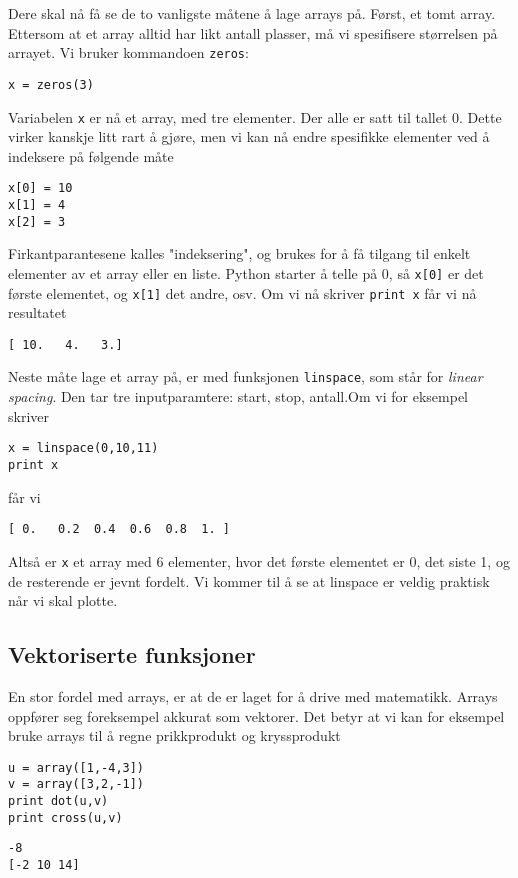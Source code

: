 \documentclass[a4paper, 11pt, notitlepage]{article}
\begin{document}
Dere skal nå få se de to vanligste måtene å lage arrays på. Først, et tomt array. Ettersom at et array alltid har likt antall plasser, må vi spesifisere størrelsen på arrayet. Vi bruker kommandoen \verb+zeros+:
\begin{lstlisting}
x = zeros(3)    
\end{lstlisting}
\vspace{-0.3cm}
Variabelen \verb+x+ er nå et array, med tre elementer. Der alle er satt til tallet 0. Dette virker kanskje litt rart å gjøre, men vi kan nå endre spesifikke elementer ved å indeksere på følgende måte
\begin{lstlisting}
x[0] = 10
x[1] = 4
x[2] = 3
\end{lstlisting}
\vspace{-0.3cm}
Firkantparantesene kalles "indeksering", og brukes for å få tilgang til enkelt elementer av et array eller en liste. Python starter å telle på 0, så \verb+x[0]+ er det første elementet, og \verb+x[1]+ det andre, osv.
Om vi nå skriver \verb+print x+ får vi nå resultatet
\begin{lstlisting}
[ 10.   4.   3.]
\end{lstlisting}
\vspace{-0.3cm}

Neste måte lage et array på, er med funksjonen \verb+linspace+, som står for \emph{linear spacing}. Den tar tre inputparamtere: start, stop, antall.Om vi for eksempel skriver
\begin{lstlisting}
x = linspace(0,10,11)
print x
\end{lstlisting}
\vspace{-0.3cm}
får vi 
\begin{lstlisting}
[ 0.   0.2  0.4  0.6  0.8  1. ]
\end{lstlisting}
\vspace{-0.3cm}
Altså er \verb+x+ et array med 6 elementer, hvor det første elementet er 0, det siste 1, og de resterende er jevnt fordelt. Vi kommer til å se at linspace er veldig praktisk når vi skal plotte.

\subsection{Vektoriserte funksjoner}
En stor fordel med arrays, er at de er laget for å drive med matematikk. Arrays oppfører seg foreksempel akkurat som vektorer. Det betyr at vi kan for eksempel bruke arrays til å regne prikkprodukt og kryssprodukt
\begin{lstlisting}
u = array([1,-4,3])
v = array([3,2,-1])
print dot(u,v)
print cross(u,v)
\end{lstlisting}
\vspace{-0.3cm}
\begin{lstlisting}
-8
[-2 10 14]
\end{lstlisting}
\vspace{-0.3cm}
\end{document}
